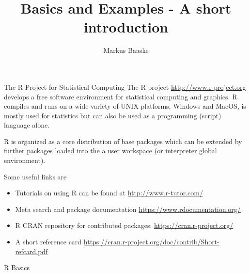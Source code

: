 \documentclass[10pt]{beamer}
\title{\proglang{R} Basics and Examples - A short introduction}
\author{Markus Baaske}
\let\proglang=\textsf
\begin{document}
\maketitle

\begin{frame}{The R Project for Statistical Computing}
The \proglang{R} project \url{http://www.r-project.org} develops a free
software environment for statistical computing and graphics. \proglang{R}
compiles and runs on a wide variety of UNIX platforms, Windows and MacOS, is mostly used for statistics but can also be
used as a programming (script) language alone. \par
\proglang{R} is organized as a core distribution of base packages which can be
extended by further packages loaded into the a user workspace (or interpreter
global environment).\par
Some useful links are
\begin{itemize}
  \item Tutorials on using \proglang{R} can be
  found at \url{http://www.r-tutor.com/}
  \item Meta search and package
  documentation \url{https://www.rdocumentation.org/}
  \item \proglang{R} CRAN repository for contributed packages:
  \url{https://cran.r-project.org/}
  \item A short reference card \url{https://cran.r-project.org/doc/contrib/Short-refcard.pdf}
\end{itemize}
\end{frame}

\begin{frame}[fragile]{\proglang{R} Basics}
\end{frame}
\end{document}
